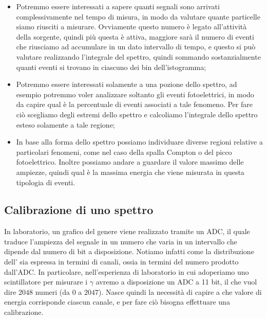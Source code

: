\begin{itemize}[leftmargin=0.5cm]
   \item Potremmo essere interessati a sapere quanti segnali sono arrivati complessivamente nel tempo di misura, in modo da valutare quante particelle siamo riusciti a misurare. Ovviamente questo numero è legato all'attività della sorgente, quindi più questa è attiva, maggiore sarà il numero di eventi che riusciamo ad accumulare in un dato intervallo di tempo, e questo si può valutare realizzando l'integrale del spettro, quindi sommando sostanzialmente quanti eventi si trovano in ciascuno dei bin dell'istogramma;
   \item Potremmo essere interessati solamente a una pozione dello spettro, ad esempio potremmo voler analizzare soltanto gli eventi fotoelettrici, in modo da capire qual è la percentuale di eventi associati a tale fenomeno. Per fare ciò scegliamo degli estremi dello spettro e calcoliamo l'integrale dello spettro esteso solamente a tale regione;
   \item In base alla forma dello spettro possiamo individuare diverse regioni relative a particolari fenomeni, come nel caso della spalla Compton o del picco fotoelettrico. Inoltre possiamo andare a guardare il valore massimo delle ampiezze, quindi qual è la massima energia che viene misurata in questa tipologia di eventi.
\end{itemize}

\subsection{Calibrazione di uno spettro}

In laboratorio, un grafico del genere viene realizzato tramite un ADC, il quale traduce l'ampiezza del segnale in un numero che varia in un intervallo che dipende dal numero di bit a disposizione. Notiamo infatti come la distribuzione dell' sia espressa in termini di canali, ossia in termini del numero prodotto dall'ADC. In particolare, nell'esperienza di laboratorio in cui adoperiamo uno scintillatore per misurare i $\gamma$ avremo a disposizione un ADC a 11 bit, il che vuol dire $2048$ numeri (da $0$ a $2047$). Nasce quindi la necessità di capire a che valore di energia corrisponde ciascun canale, e per fare ciò bisogna effettuare una calibrazione.

